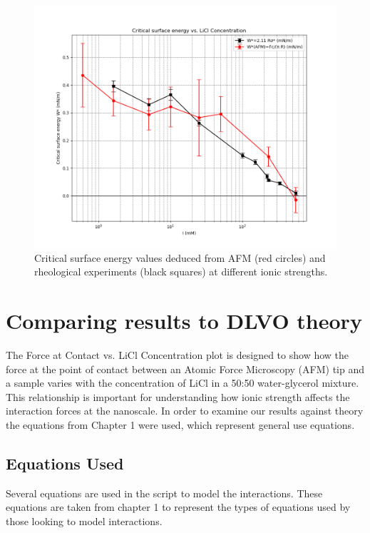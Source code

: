 \begin{figure}[h!]
\centering
\includegraphics[width=\textwidth]{chapter8/Rheology/Comparison graph.png}
\caption{Critical surface energy values deduced from AFM (red circles) and rheological experiments (black squares) at different ionic strengths.}
\label{fig:critical_surface_energy}
\end{figure}

\section{Comparing results to DLVO theory}


The Force at Contact vs. LiCl Concentration plot is designed to show how the force at the point of contact between an Atomic Force Microscopy (AFM) tip and a sample varies with the concentration of LiCl in a 50:50 water-glycerol mixture. This relationship is important for understanding how ionic strength affects the interaction forces at the nanoscale. In order to examine our results against theory the equations from Chapter 1 were used, which represent general use equations.

\subsection*{Equations Used}

Several equations are used in the script to model the interactions. These equations are taken from chapter 1 to represent the types of equations used by those looking to model interactions. 

